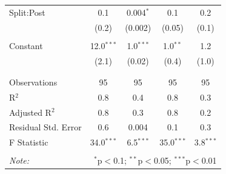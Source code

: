 \documentclass[12pt, a4paper]{article}
\begin{document}
\begin{table}[!htbp]
\begin{tabular}{@{\extracolsep{5pt}}lcccc}
 Split:Post & 0.1 & 0.004$^{*}$ & 0.1 & 0.2 \\ 
  & (0.2) & (0.002) & (0.05) & (0.1) \\ 
  & & & & \\ 
 Constant & 12.0$^{***}$ & 1.0$^{***}$ & 1.0$^{**}$ & 1.2 \\ 
  & (2.1) & (0.02) & (0.4) & (1.0) \\ 
  & & & & \\ 
\hline \\[-1.8ex] 
Observations & 95 & 95 & 95 & 95 \\ 
R$^{2}$ & 0.8 & 0.4 & 0.8 & 0.3 \\ 
Adjusted R$^{2}$ & 0.8 & 0.3 & 0.8 & 0.2 \\ 
Residual Std. Error & 0.6 & 0.004 & 0.1 & 0.3 \\ 
F Statistic & 34.0$^{***}$ & 6.5$^{***}$ & 35.0$^{***}$ & 3.8$^{***}$ \\ 
\hline 
\hline \\[-1.8ex] 
\textit{Note:}  & \multicolumn{4}{r}{$^{*}$p$<$0.1; $^{**}$p$<$0.05; $^{***}$p$<$0.01} \\ 
\end{tabular} 
\end{table} %
\end{document}

